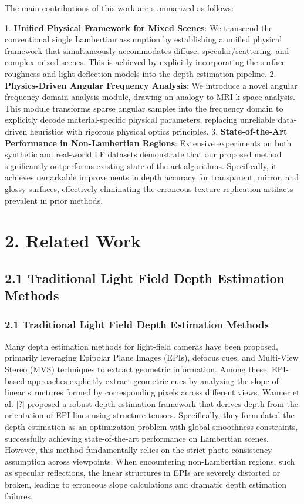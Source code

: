 \documentclass[journal]{IEEEtran}
\begin{document}
The main contributions of this work are summarized as follows:

1. \textbf{Unified Physical Framework for Mixed Scenes}: We transcend the conventional single Lambertian assumption by establishing a unified physical framework that simultaneously accommodates diffuse, specular/scattering, and complex mixed scenes. This is achieved by explicitly incorporating the surface roughness and light deflection models into the depth estimation pipeline.
2. \textbf{Physics-Driven Angular Frequency Analysis}: We introduce a novel angular frequency domain analysis module, drawing an analogy to MRI k-space analysis. This module transforms sparse angular samples into the frequency domain to explicitly decode material-specific physical parameters, replacing unreliable data-driven heuristics with rigorous physical optics principles.
3. \textbf{State-of-the-Art Performance in Non-Lambertian Regions}: Extensive experiments on both synthetic and real-world LF datasets demonstrate that our proposed method significantly outperforms existing state-of-the-art algorithms. Specifically, it achieves remarkable improvements in depth accuracy for transparent, mirror, and glossy surfaces, effectively eliminating the erroneous texture replication artifacts prevalent in prior methods.

\section{2. Related Work}

\subsection{2.1 Traditional Light Field Depth Estimation Methods}

\subsubsection{2.1 Traditional Light Field Depth Estimation Methods}

Many depth estimation methods for light-field cameras have been proposed, primarily leveraging Epipolar Plane Images (EPIs), defocus cues, and Multi-View Stereo (MVS) techniques to extract geometric information. Among these, EPI-based approaches explicitly extract geometric cues by analyzing the slope of linear structures formed by corresponding pixels across different views. Wanner et al. [?] proposed a robust depth estimation framework that derives depth from the orientation of EPI lines using structure tensors. Specifically, they formulated the depth estimation as an optimization problem with global smoothness constraints, successfully achieving state-of-the-art performance on Lambertian scenes. However, this method fundamentally relies on the strict photo-consistency assumption across viewpoints. When encountering non-Lambertian regions, such as specular reflections, the linear structures in EPIs are severely distorted or broken, leading to erroneous slope calculations and dramatic depth estimation failures.
\end{document}
